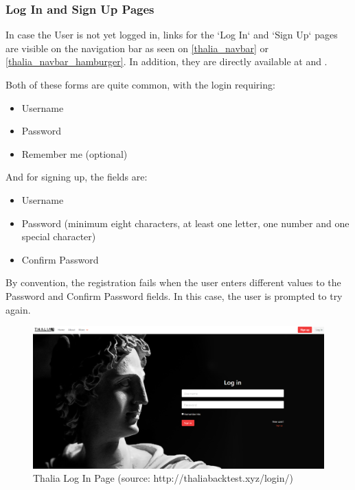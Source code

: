 \documentclass[main.tex]{subfiles}
\begin{document}
\subsubsection{Log In and Sign Up Pages}
In case the User is not yet logged in, links for the `Log In` and `Sign Up` pages are visible on the navigation bar as seen on \figurename{\ref{thalia_navbar}} or \figurename{\ref{thalia_navbar_hamburger}}. In addition, they are directly available at  and .

Both of these forms are quite common, with the login requiring:

\begin{itemize}
    \item Username
    \item Password
    \item Remember me (optional)
\end{itemize}

And for signing up, the fields are:
\begin{itemize}
    \item Username
    \item Password (minimum eight characters, at least one letter, one number and one special character)
    \item Confirm Password

\end{itemize}

By convention, the registration fails when the user enters different values to the Password and Confirm Password fields. In this case, the user is prompted to try again.

\begin{figure}[H]
   \centering
   \includegraphics[width=\textwidth]{08Appendices/081User/081Pictures/login.png}
   \caption{Thalia Log In Page (source: http://thaliabacktest.xyz/login/)}
   \label{thalia_login}
\end{figure}
\end{document}
